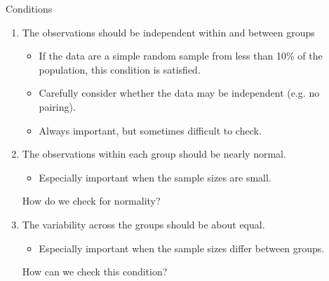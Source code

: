 \documentclass[
  ignorenonframetext,
]{beamer}
\begin{document}
\begin{frame}{Conditions}
\protect\hypertarget{conditions}{}
\begin{enumerate}

\item The observations should be independent within and between groups

\begin{itemize}
\item If the data are a simple random sample from less than 10\% of the population, this condition is satisfied.
\item Carefully consider whether the data may be independent (e.g. no pairing). 
\item Always important, but sometimes difficult to check.
\end{itemize}

\pause

\item The observations within each group should be nearly normal.

\begin{itemize}
\item Especially important when the sample sizes are small.
\end{itemize}

\alert{How do we check for normality?}

\pause

\item The variability across the groups should be about equal.

\begin{itemize}
\item Especially important when the sample sizes differ between groups.
\end{itemize}

\alert{How can we check this condition?}

\end{enumerate}
\end{frame}
\end{document}
